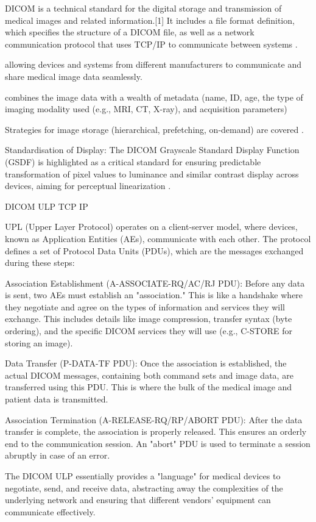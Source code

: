DICOM is a technical standard for the digital storage and transmission
of medical images and related information.[1] It includes a file
format definition, which specifies the structure of a DICOM file, as
well as a network communication protocol that uses TCP/IP to
communicate between systems \cite{wikipedia2025DICOM}.

allowing devices and systems from different manufacturers to communicate and share medical image data seamlessly.

combines the image data with a wealth of metadata (name, ID, age, the type of imaging modality used (e.g., MRI, CT, X-ray), and acquisition parameters)

Strategies for image storage (hierarchical, prefetching, on-demand)
are covered \cite{bushberg2011essential}.

Standardisation of Display: The DICOM Grayscale Standard Display Function (GSDF) is highlighted as a critical standard for ensuring predictable transformation of pixel values to luminance and similar contrast display across devices, aiming for perceptual linearization \cite{bushberg2011essential}.

DICOM ULP
TCP
IP


UPL (Upper Layer Protocol) operates on a client-server model, where devices, known as Application Entities (AEs), communicate with each other. The protocol defines a set of Protocol Data Units (PDUs), which are the messages exchanged during these steps:

    Association Establishment (A-ASSOCIATE-RQ/AC/RJ PDU): Before any data is sent, two AEs must establish an "association." This is like a handshake where they negotiate and agree on the types of information and services they will exchange. This includes details like image compression, transfer syntax (byte ordering), and the specific DICOM services they will use (e.g., C-STORE for storing an image).

Data Transfer (P-DATA-TF PDU): Once the association is established, the actual DICOM messages, containing both command sets and image data, are transferred using this PDU. This is where the bulk of the medical image and patient data is transmitted.

Association Termination (A-RELEASE-RQ/RP/ABORT PDU): After the data transfer is complete, the association is properly released. This ensures an orderly end to the communication session. An "abort" PDU is used to terminate a session abruptly in case of an error.

The DICOM ULP essentially provides a "language" for medical devices to negotiate, send, and receive data, abstracting away the complexities of the underlying network and ensuring that different vendors' equipment can communicate effectively.
